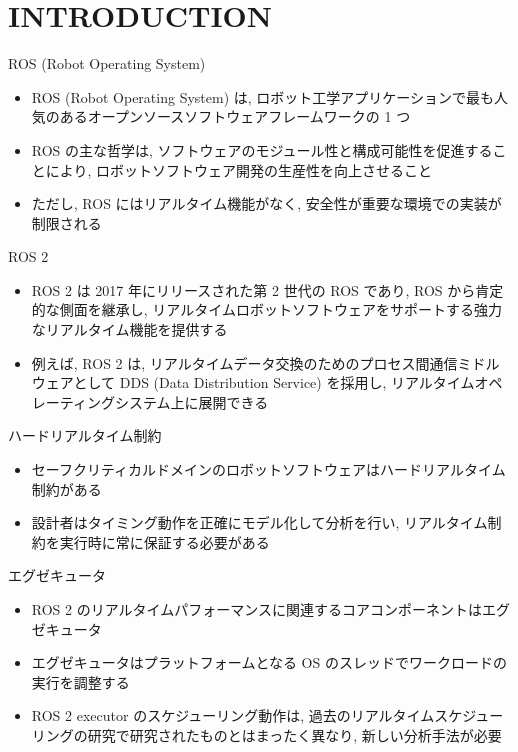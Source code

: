 
\section{INTRODUCTION}
\label{sec: introduction}

\begin{frame}{ROS (Robot Operating System)}
    \begin{itemize}
        \item ROS (Robot Operating System) は, ロボット工学アプリケーションで最も人気のあるオープンソースソフトウェアフレームワークの 1 つ
        \item ROS の主な哲学は, ソフトウェアのモジュール性と構成可能性を促進することにより, ロボットソフトウェア開発の生産性を向上させること
        \item ただし, ROS にはリアルタイム機能がなく, 安全性が重要な環境での実装が制限される

    \end{itemize}
\end{frame}

\begin{frame}{ROS 2}
    \begin{itemize}
        \item ROS 2 は 2017 年にリリースされた第 2 世代の ROS であり, ROS から肯定的な側面を継承し, リアルタイムロボットソフトウェアをサポートする強力なリアルタイム機能を提供する
        \item 例えば, ROS 2 は, リアルタイムデータ交換のためのプロセス間通信ミドルウェアとして DDS (Data Distribution Service) を採用し, リアルタイムオペレーティングシステム上に展開できる
    \end{itemize}
\end{frame}

\begin{frame}{ハードリアルタイム制約}
    \begin{itemize}
        \item セーフクリティカルドメインのロボットソフトウェアはハードリアルタイム制約がある
        \item 設計者はタイミング動作を正確にモデル化して分析を行い, リアルタイム制約を実行時に常に保証する必要がある
    \end{itemize}
\end{frame}

\begin{frame}{エグゼキュータ}
    \begin{itemize}

        \item ROS 2 のリアルタイムパフォーマンスに関連するコアコンポーネントはエグゼキュータ
        \item エグゼキュータはプラットフォームとなる OS のスレッドでワークロードの実行を調整する
        \item ROS 2 executor のスケジューリング動作は, 過去のリアルタイムスケジューリングの研究で研究されたものとはまったく異なり, 新しい分析手法が必要

    \end{itemize}
\end{frame}

